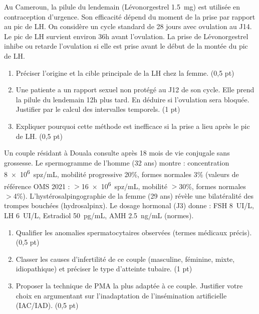 \documentclass[11pt]{article}
\begin{document}
\begin{exercice}
\label{exo:cycle_femme}
Au Cameroun, la pilule du lendemain (Lévonorgestrel \SI{1,5}{mg}) est utilisée en contraception d'urgence. Son efficacité dépend du moment de la prise par rapport au pic de LH.
On considère un cycle standard de 28 jours avec ovulation au J14. Le pic de LH survient environ 36h avant l'ovulation. La prise de Lévonorgestrel inhibe ou retarde l'ovulation si elle est prise avant le début de la montée du pic de LH.

\begin{enumerate}
\item Préciser l'origine et la cible principale de la LH chez la femme. \hfill (0,5 pt)
\item Une patiente a un rapport sexuel non protégé au J12 de son cycle. Elle prend la pilule du lendemain 12h plus tard. En déduire si l'ovulation sera bloquée. Justifier par le calcul des intervalles temporels. \hfill (1 pt)
\item Expliquer pourquoi cette méthode est inefficace si la prise a lieu après le pic de LH. \hfill (0,5 pt)
\end{enumerate}
\end{exercice}

\begin{exercice}
\label{exo:infertilite}
Un couple résidant à Douala consulte après 18 mois de vie conjugale sans grossesse. Le spermogramme de l'homme (32 ans) montre : concentration \SI{8e6}{spz/mL}, mobilité progressive 20\%, formes normales 3\% (valeurs de référence OMS 2021 : $>$\SI{16e6}{spz/mL}, mobilité $>$30\%, formes normales $>$4\%).
L'hystérosalpingographie de la femme (29 ans) révèle une bilatéralité des trompes bouchées (hydrosalpinx). Le dosage hormonal (J3) donne : FSH \SI{8}{UI/L}, LH \SI{6}{UI/L}, Estradiol \SI{50}{pg/mL}, AMH \SI{2,5}{ng/mL} (normes).

\begin{enumerate}
\item Qualifier les anomalies spermatocytaires observées (termes médicaux précis). \hfill (0,5 pt)
\item Classer les causes d'infertilité de ce couple (masculine, féminine, mixte, idiopathique) et préciser le type d'atteinte tubaire. \hfill (1 pt)
\item Proposer la technique de PMA la plus adaptée à ce couple. Justifier votre choix en argumentant sur l'inadaptation de l'insémination artificielle (IAC/IAD). \hfill (0,5 pt)
\end{enumerate}
\end{exercice}
\end{document}
